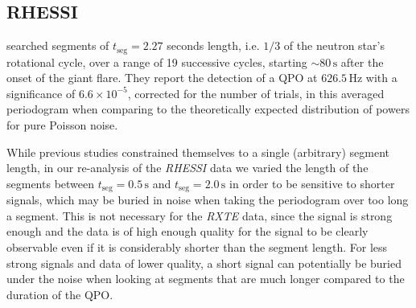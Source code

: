 \documentclass{emulateapj}
\begin{document}
\subsection{RHESSI}
\label{sec:rhessi_results}

\citealt{Watts06} searched segments of $t_{\mathrm{seg}} = 2.27$ seconds length, i.e. $1/3$ of the neutron star's rotational cycle, over a range of 19 successive cycles, starting $\sim 80 \, \mathrm{s}$ after the onset of the giant flare. They report the detection of a QPO at $626.5 \, \mathrm{Hz}$ with a significance of $6.6 \times 10^{-5}$, corrected for the number of trials, in this averaged periodogram when comparing to the theoretically expected distribution of powers for pure Poisson noise.

While previous studies constrained themselves to a single (arbitrary) segment length, in our re-analysis of the {\it RHESSI} data we varied the length of the segments between $t_{\mathrm{seg}} = 0.5 \, \mathrm{s}$ and $t_{\mathrm{seg}} = 2.0 \, \mathrm{s}$  in order to be sensitive to shorter signals, which may be buried in noise when taking the periodogram over too long a segment. This is not necessary for the {\it RXTE} data, since the signal is strong enough and the data is of high enough quality for the signal to be clearly observable even if it is considerably shorter than the segment length. For less strong signals and data of lower quality, a short signal can potentially be buried under the noise when looking at segments that are much longer compared to the duration of the QPO. 
\end{document}
